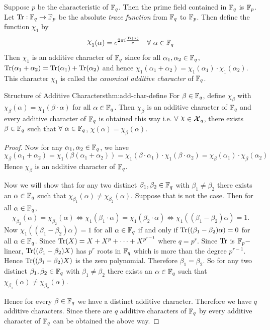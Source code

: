 Suppose $p$ be the characteristic of $\mathbb{F}_q$.  Then the prime field contained in $\mathbb{F}_q$ is $\mathbb{F}_p$. Let $\operatorname{Tr}:\mathbb{F}_q\to\mathbb{F}_p$ be the absolute \emph{trace function} from $\mathbb{F}_q$ to $\mathbb{F}_p$. Then define the function $\chi_1$ by $$\chi_1(\alpha)=e^{2\pi i\frac{\tr(\alpha)}{p}}\quad \forall\ \alpha\in \bbF_q$$Then $\chi_1$ is an additive character of $\mathbb{F}_q$ since for all $\alpha_1,\alpha_2\in\mathbb{F}_q$, $\operatorname{Tr}(\alpha_1+\alpha_2)=\operatorname{Tr}(\alpha_1)+\operatorname{Tr}(\alpha_2)$ and hence $\chi_1(\alpha_1+\alpha_2)=\chi_1(\alpha_1)\cdot \chi_1(\alpha_2)$. This character $\chi_1$ is called the \emph{canonical additive character} of $\mathbb{F}_q$.
\begin{Theorem}{Structure of Additive Characters}{thm:add-char-define}
  For $\beta\in\mathbb{F}_q$, define $\chi_{\beta}$ with $\chi_{\beta}(\alpha)=\chi_1(\beta\cdot \alpha)$ for all $\alpha\in\mathbb{F}_q$. Then $\chi_{\beta}$ is an additive character of $\mathbb{F}_q$ and every additive character of $\mathbb{F}_q$ is obtained this way i.e. $\forall\ \chi\in\Xq$, there exists $\beta\in\mathbb{F}_q$ such that $\forall\ \alpha\in\mathbb{F}_q$, $\chi(\alpha)=\chi_{\beta}(\alpha)$. 
\end{Theorem}
\begin{proof}
  Now for any $\alpha_1,\alpha_2\in\mathbb{F}_q$, we have $$\chi_{\beta}(\alpha_1+\alpha_2)=\chi_1(\beta(\alpha_1+\alpha_2))=\chi_1(\beta\cdot \alpha_1)\cdot \chi_1(\beta\cdot \alpha_2)=\chi_{\beta}(\alpha_1)\cdot \chi_{\beta}(\alpha_2)$$ Hence $\chi_{\beta}$ is an additive character of $\mathbb{F}_q$.

  Now we will show that for any two distinct $\beta_1,\beta_2\in\mathbb{F}_q$ with $\beta_1\neq \beta_2$ there exists an $\alpha\in\mathbb{F}_q$ such that $\chi_{\beta_1}(\alpha)\neq \chi_{\beta_2}(\alpha)$. Suppose that is not the case. Then for all $\alpha\in\mathbb{F}_q$, $$\chi_{\beta_2}(\alpha)=\chi_{\beta_2}(\alpha)\iff \chi_1(\beta_1\cdot \alpha)=\chi_1(\beta_2\cdot \alpha)\iff \chi_1((\beta_1-\beta_2)\alpha)=1.$$Now $\chi_1((\beta_1-\beta_2)\alpha)=1$ for all $\alpha\in \mathbb{F}_q$ if and only if $\operatorname{Tr}((\beta_1-\beta_2)\alpha)=0$ for all $\alpha\in\mathbb{F}_q$. Since  $\operatorname{Tr}(X)=X+X^{p}+\cdots+X^{p^{r-1}}$ where $q=p^r$. Since $\operatorname{Tr}$ is $\mathbb{F}_p-$linear,  $\operatorname{Tr}((\beta_1-\beta_2)X)$ has $p^r$ roots in $\mathbb{F}_q$ which is more than the degree $p^{r-1}$. Hence $\operatorname{Tr}((\beta_1-\beta_2)X)$ is the zero polynomial. Therefore $\beta_1=\beta_2$. So for any two distinct $\beta_1,\beta_2\in\mathbb{F}_q$ with $\beta_1\neq \beta_2$ there exists an $\alpha\in\mathbb{F}_q$ such that $\chi_{\beta_1}(\alpha)\neq \chi_{\beta_2}(\alpha)$.

  Hence for every $\beta\in\mathbb{F}_q$ we have a distinct additive character. Therefore we have $q$ additive characters. Since there are $q$ additive characters of $\mathbb{F}_q$ by  every additive character of $\mathbb{F}_q$ can be obtained the above way.
\end{proof}
 

